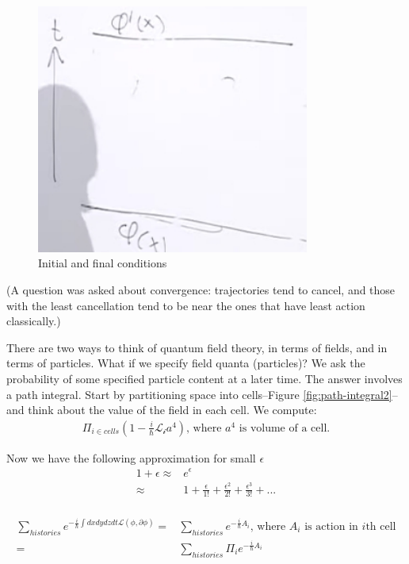 \documentclass[]{article}
\begin{document}
\begin{figure}[H]
	\caption{Initial and final conditions}\label{fig:path-integral1}
	\includegraphics[width=0.8\textwidth]{path-integral1}
\end{figure}

(A question was asked about convergence: trajectories tend to cancel, and those with the least cancellation tend to be near the ones that have least action classically.)

There are two ways to think of quantum field theory, in terms of fields, and in terms of particles. What if we specify field quanta (particles)? We ask the probability of some specified particle content at a later time. The answer involves a path integral. Start by partitioning space into cells--Figure \ref{fig:path-integral2}--and think about the value of the field in each cell. We compute:
\begin{align*}
	\Pi_{i\in cells}(1-\frac{i}{\hslash} \mathcal{L_i}a^4) \text{, where $a^4$ is volume of a cell.}
\end{align*}
 
Now we have the following approximation for small $\epsilon$
\begin{align*}
	1 + \epsilon \approx &e^\epsilon\\
	\approx& 1 + \frac{\epsilon}{1!} + \frac{\epsilon^2}{2!}  + \frac{\epsilon^3}{3!} +...\\
\end{align*}

\begin{align*}
	\sum_{histories} e^{-\frac{i}{\hslash} \int dx dy dz dt\mathcal{L}(\phi,\partial \phi) } =& \sum_{histories} e^{-\frac{i}{\hslash} A_i } \text{, where $A_i$ is action in $i$th cell}\\
	=& \sum_{histories} \Pi_i e^{-\frac{i}{\hslash} A_i }
\end{align*}
\end{document}
